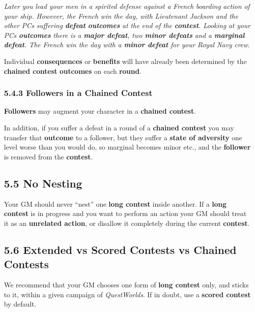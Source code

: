\documentclass[
]{article}
\begin{document}
\emph{Later you lead your men in a spirited defense against a French
boarding action of your ship. However, the French win the day, with
Lieutenant Jackson and the other PCs suffering \textbf{defeat}
\textbf{outcomes} at the end of the \textbf{contest}. Looking at your
PCs \textbf{outcomes} there is a \textbf{major defeat}, two
\textbf{minor defeats} and a \textbf{marginal defeat}. The French win
the day with a \textbf{minor defeat} for your Royal Navy crew.}

Individual \textbf{consequences} or \textbf{benefits} will have already
been determined by the \textbf{chained contest} \textbf{outcomes} on
each \textbf{round}.

\hypertarget{followers-in-a-chained-contest}{%
\subsubsection{5.4.3 Followers in a Chained
Contest}\label{followers-in-a-chained-contest}}

\textbf{Followers} may augment your character in a \textbf{chained
contest}.

In addition, if you suffer a defeat in a round of a \textbf{chained
contest} you may transfer that \textbf{outcome} to a follower, but they
suffer a \textbf{state of adversity} one level worse than you would do,
so marginal becomes minor etc., and the \textbf{follower} is removed
from the \textbf{contest}.

\hypertarget{no-nesting}{%
\subsection{5.5 No Nesting}\label{no-nesting}}

Your GM should never ``nest'' one \textbf{long contest} inside another.
If a \textbf{long contest} is in progress and you want to perform an
action your GM should treat it as an \textbf{unrelated action}, or
disallow it completely during the current \textbf{contest}.

\hypertarget{extended-vs-scored-contests-vs-chained-contests}{%
\subsection{5.6 Extended vs Scored Contests vs Chained
Contests}\label{extended-vs-scored-contests-vs-chained-contests}}

We recommend that your GM chooses one form of \textbf{long contest}
only, and sticks to it, within a given campaign of \emph{QuestWorlds}.
If in doubt, use a \textbf{scored contest} by default.
\end{document}
